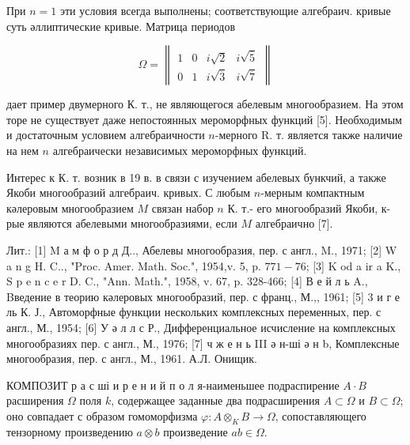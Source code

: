 \documentclass[10pt]{article}
\begin{document}
При $n=1$ эти условия всегда выполнены; соответствующие алгебраич. кривые суть әллиптические кривые. Матрица периодов



\[

\Omega=\left\|\begin{array}{llll}

1 & 0 & i \sqrt{2} & i \sqrt{\overline{5}} \\

0 & 1 & i \sqrt{\overline{3}} & i \sqrt{\overline{7}}

\end{array}\right\|

\]



дает пример двумерного К. т., не являющегося абелевым многообразием. На этом торе не существует даже непостоянных мероморфных функций [5]. Необходимым и достаточным условием алгебраичности $n$-мерного R. т. является также наличие на нем $n$ алгебраически независимых мероморфных функций.



Интерес к К. т. возник в 19 в. в связи с изучением абелевых бункчий, а также Якоби многообразий алгебраич. кривых. С любым $n$-мерным компактным кәлеровым многообразием $M$ связан набор $n$ К. т.- его многообразий Якоби, к-рые являются абелевыми многообразиями, если $M$ алгебраично [7].



Лит.: [1] M а м ф о р д Д.., Абелевы многообразия, пер. с англ., M., 1971; [2] W a n g H. C.., "Proc. Amer. Math. Soc.", 1954,v. 5, p. $771-76$; [3] K od a ir a K., S p e n c e r D. C., "Ann. Math.", 1958, v. 67, p. 328-466; [4] В е й л ь A., Bведение в теорию кәлеровых многообразий, пер. с франц., М.,, 1961; [5] 3 и г е ль К. Ј., Автоморфные функции нескольких комплексных переменных, пер. с англ., М., 1954; [6] У ә л л с Р., Дифференциальное исчисление на комплексных многообразиях пер. с англ., М., 1976; [7] ч ж е н ь III ә н-ші ә н b, Комплексные многообразия, пер. с англ., М., 1961. А.Л. Онищик.



КОМПОЗИТ р а с ші и р е н и й п о л я-наименьшее подраспирение $A \cdot B$ расширения $\Omega$ поля $k$, содержащее заданные два подрасширения $A \subset \Omega$ и $B \subset \Omega$; оно совпадает с образом гомоморфизма $\varphi: A \otimes_{K} B \rightarrow \Omega$, сопоставляющего тензорному произведению $a \otimes b$ произведение $a b \in \Omega$.
\end{document}
